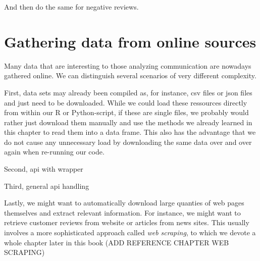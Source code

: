 And then do the same for negative reviews.







\section{Gathering data from online sources}
\label{sec:gathering}


Many data that are interesting to those analyzing communication are nowadays gathered online.
We can distinguish several scenarios of very different complexity.

First, data sets may already been compiled as, for instance, csv files or json files and just need to be downloaded.
While we could load these ressources directly from within our R or Python-script, if these are single files, we probably would rather just download them manually and use the methods we already learned in this chapter to read them into a data frame. This also has the advantage that we do not cause any unnecessary load by downloading the same data over and over again when re-running our code.

Second, api with wrapper

Third, general api handling

Lastly, we might want to automatically download large quanties of web pages themselves and extract relevant information. For instance, we might want to retrieve customer reviews from website or articles from news sites. This usually involves a more sophisticated approach called \emph{web scraping}, to which we devote a whole chapter later in this book (ADD REFERENCE CHAPTER WEB SCRAPING)

